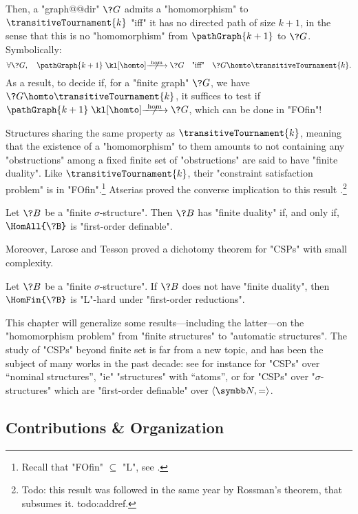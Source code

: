 Then, a "graph@@dir" $\?G$ admits a "homomorphism" to $\transitiveTournament{k}$ "iff"
it has no directed path of size $k+1$, in the sense that this is no "homomorphism"
from $\pathGraph{k+1}$ to $\?G$. Symbolically:
\[
	\forall \?G,\quad
	\pathGraph{k+1} \nothomto \?G
	\quad\text{"iff"}\quad
	\?G \homto \transitiveTournament{k}.
\]
As a result, to decide if, for a "finite graph" $\?G$, we have
$\?G \homto \transitiveTournament{k}$, it suffices
to test if $\pathGraph{k+1} \nothomto \?G$, which can be done in "FOfin"!

Structures sharing the same property as $\transitiveTournament{k}$, meaning that
the existence of a "homomorphism" to them amounts to not containing any "obstructions"
among a fixed finite set of "obstructions" are said to have "finite duality".
Like $\transitiveTournament{k}$, their "constraint satisfaction problem"
is in "FOfin".\footnote{Recall that "FOfin" $\subseteq$ "L", see .}
Atserias proved the converse implication to this result \cite[Corollary 4]{Atserias2008DigraphColoring}.\footnote{Todo: this result was followed in the same year
by Rossman's theorem, that subsumes it. todo:addref.}

\begin{proposition}
	\AP Let $\?B$ be a "finite $\sigma$-structure". Then $\?B$ has "finite duality"
	if, and only if, $\HomAll{\?B}$ is "first-order definable".
\end{proposition}

Moreover, Larose and Tesson proved a dichotomy theorem for "CSPs" with small complexity.
\begin{proposition}
	Let $\?B$ be a "finite $\sigma$-structure". If $\?B$ does not have "finite duality",
	then $\HomFin{\?B}$ is "L"-hard under "first-order reductions".
\end{proposition}

This chapter will generalize some results---including the latter---on the "homomorphism problem"
from "finite structures" to "automatic structures". The study of "CSPs" beyond finite set
is far from a new topic, and has been the subject of many works in the past decade:
see for instance \cite{KlinKopczynskiOchremiakTorunczyk2015LocallyFiniteCSP} for "CSPs"
over ``nominal structures'', "ie" "structures" with ``atoms'',
or \cite{KlinLasotaOchremiakTorunczyk2016HomomorphismProblems} for "CSPs" over
"$\sigma$-structures" which are "first-order definable" over $\tup{\N,{=}}$.


\subsection{Contributions \& Organization}

